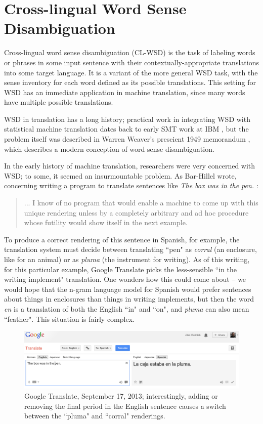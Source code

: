 \section{Cross-lingual Word Sense Disambiguation}

Cross-lingual word sense disambiguation (CL-WSD) is the task of labeling words
or phrases in some input sentence with their contextually-appropriate
translations into some target language.
It is a variant of the more general WSD
task, with the sense inventory for each word defined as its possible
translations.
This setting for WSD has an immediate application in machine translation, since
many words have multiple possible translations.

WSD in translation has a long history; practical work in integrating
WSD with statistical machine translation dates back to early SMT work at IBM
\cite{Brown91word-sensedisambiguation}, but the problem itself was described in
Warren Weaver's prescient 1949 memorandum \cite{weavermemo}, which describes a
modern conception of word sense disambiguation.

In the early history of machine translation, researchers were very concerned
with WSD; to some, it seemed an insurmountable problem. As Bar-Hillel wrote,
concerning writing a program to translate sentences like \emph{The box was in
the pen.} \cite{barhillel1960}:

\begin{quote}
... I know of no program that would enable a machine to come up with this
unique rendering unless by a completely arbitrary and ad hoc procedure whose
futility would show itself in the next example.
\end{quote}

To produce a correct rendering of this sentence in Spanish, for example, the
translation system must decide between translating ``pen" as \emph{corral} (an
enclosure, like for an animal) or as \emph{pluma} (the instrument for writing).
As of this writing, for this particular example, Google Translate picks the
less-sensible ``in the writing implement" translation. One wonders how this
could come about -- we would hope that the n-gram language model for Spanish
would prefer sentences about things in enclosures than things in writing
implements, but then the word \emph{en} is a translation of both the English
``in" and ``on", and \emph{pluma} can also mean ``feather". This situation is
fairly complex.

\begin{figure}
  \includegraphics[width=12cm]{box-in-pen.png}
  \caption{Google Translate, September 17, 2013; interestingly, adding or
  removing the final period in the English sentence causes a switch between the
  ``pluma" and ``corral" renderings.}
  \label{fig:box-in-pen}
\end{figure}

